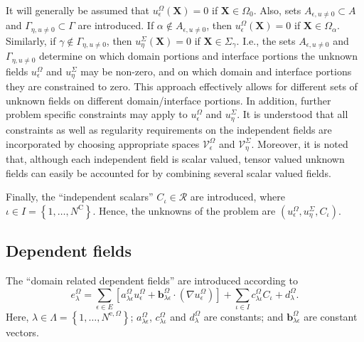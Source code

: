 \documentclass[pdftex,a4paper,12pt,abstracton]{scrartcl}
\begin{document}
It will generally be assumed that $u^\Omega_\epsilon(\boldsymbol{X}) = 0$ if $\boldsymbol{X} \in \Omega_0$. Also, sets $A_{\epsilon,u\neq 0} \subset A$ and $\Gamma_{\eta,u\neq 0} \subset \Gamma$ are introduced. If $\alpha \notin A_{\epsilon,u\neq 0}$, then $u^\Omega_\epsilon(\boldsymbol{X})=0$ if $\boldsymbol{X} \in \Omega_\alpha$. Similarly, if
$\gamma \notin \Gamma_{\eta,u\neq 0}$, then $u^\Sigma_\eta(\boldsymbol{X})=0$ if $\boldsymbol{X} \in \Sigma_\gamma$. I.e., the sets $A_{\epsilon,u\neq 0}$ and $\Gamma_{\eta,u\neq 0}$ determine on which domain portions and interface portions the unknown fields $u^\Omega_\epsilon$ and $u^\Sigma_\eta$ may be non-zero, and on which domain and interface portions they are constrained to zero. This approach effectively allows for different sets of unknown fields on different domain/interface portions. In addition, further problem specific constraints may apply to $u^\Omega_\epsilon$ and $u^\Sigma_\eta$. It is understood that all constraints as well as regularity requirements on the independent fields are incorporated by choosing appropriate spaces $\mathcal{V}^\Omega_\epsilon$ and $\mathcal{V}^\Sigma_\eta$. Moreover, it is noted that, although each independent field is scalar valued, tensor valued unknown fields can easily be accounted for by combining several scalar valued fields.

Finally, the ``independent scalars'' $C_\iota \in \mathcal{R}$ are introduced, where $\iota \in I=\left\{1, \hdots, N^\mathrm{C}\right\}$. Hence, the unknowns of the problem are $(u^\Omega_\epsilon, u^\Sigma_\eta, C_\iota)$.

\subsection{Dependent fields}
The ``domain related dependent fields'' are introduced according to
\begin{equation}
e^\Omega_\lambda = \sum_{\epsilon \in E} \left[ a^\Omega_{\lambda\epsilon} u^\Omega_\epsilon + \boldsymbol{b}^\Omega_{\lambda \epsilon} \cdot (\nabla u^\Omega_\epsilon) \right] + \sum_{\iota \in I}c^\Omega_{\lambda\iota} C_\iota  + d^\Omega_\lambda.
\label{dependent_field_domain}
\end{equation}
Here, $\lambda \in \Lambda=\left\{1, \hdots, N^{\mathrm{e},\Omega}\right\}$; $a^\Omega_{\lambda\epsilon}$, $c^\Omega_{\lambda\iota}$ and $d^\Omega_\lambda$ are constants; and $\boldsymbol{b}^\Omega_{\lambda\epsilon}$ are constant vectors.
\end{document}

